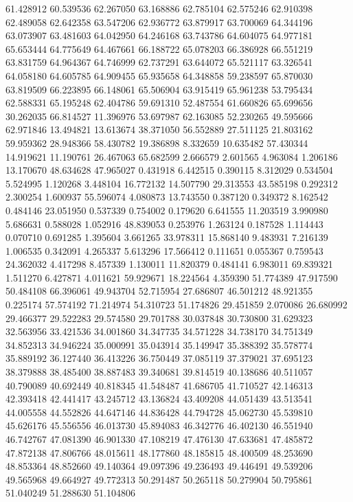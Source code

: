 61.428912
60.539536
62.267050
63.168886
62.785104
62.575246
62.910398
62.489058
62.642358
63.547206
62.936772
63.879917
63.700069
64.344196
63.073907
63.481603
64.042950
64.246168
63.743786
64.604075
64.977181
65.653444
64.775649
64.467661
66.188722
65.078203
66.386928
66.551219
63.831759
64.964367
64.746999
62.737291
63.644072
65.521117
63.326541
64.058180
64.605785
64.909455
65.935658
64.348858
59.238597
65.870030
63.819509
66.223895
66.148061
65.506904
63.915419
65.961238
53.795434
62.588331
65.195248
62.404786
59.691310
52.487554
61.660826
65.699656
30.262035
66.814527
11.396976
53.697987
62.163085
52.230265
49.595666
62.971846
13.494821
13.613674
38.371050
56.552889
27.511125
21.803162
59.959362
28.948366
58.430782
19.386898
8.332659
10.635482
57.430344
14.919621
11.190761
26.467063
65.682599
2.666579
2.601565
4.963084
1.206186
13.170670
48.634628
47.965027
0.431918
6.442515
0.390115
8.312029
0.534504
5.524995
1.120268
3.448104
16.772132
14.507790
29.313553
43.585198
0.292312
2.300254
1.600937
55.596074
4.080873
13.743550
0.387120
0.349372
8.162542
0.484146
23.051950
0.537339
0.754002
0.179620
6.641555
11.203519
3.990980
5.686631
0.588028
1.052916
48.839053
0.253976
1.263124
0.187528
1.114443
0.070710
0.691285
1.395604
3.661265
33.978311
15.868140
9.483931
7.216139
1.006535
0.342091
4.265337
5.613296
17.566412
0.111651
0.055367
0.759543
24.362032
4.417298
8.457339
1.130011
11.820379
0.484141
6.983011
69.839321
1.511270
6.427871
4.011621
59.929671
18.224564
4.359390
51.774389
47.917590
50.484108
66.396061
49.943704
52.715954
27.686807
46.501212
48.921355
0.225174
57.574192
71.214974
54.310723
51.174826
29.451859
2.070086
26.680992
29.466377
29.522283
29.574580
29.701788
30.037848
30.730800
31.629323
32.563956
33.421536
34.001860
34.347735
34.571228
34.738170
34.751349
34.852313
34.946224
35.000991
35.043914
35.149947
35.388392
35.578774
35.889192
36.127440
36.413226
36.750449
37.085119
37.379021
37.695123
38.379888
38.485400
38.887483
39.340681
39.814519
40.138686
40.511057
40.790089
40.692449
40.818345
41.548487
41.686705
41.710527
42.146313
42.393418
42.441417
43.245712
43.136824
43.409208
44.051439
43.513541
44.005558
44.552826
44.647146
44.836428
44.794728
45.062730
45.539810
45.626176
45.556556
46.013730
45.894083
46.342776
46.402130
46.551940
46.742767
47.081390
46.901330
47.108219
47.476130
47.633681
47.485872
47.872138
47.806766
48.015611
48.177860
48.185815
48.400509
48.253690
48.853364
48.852660
49.140364
49.097396
49.236493
49.446491
49.539206
49.565968
49.664927
49.772313
50.291487
50.265118
50.279904
50.795861
51.040249
51.288630
51.104806
